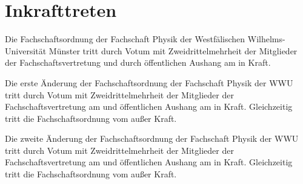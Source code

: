 \section{Inkrafttreten}
Die Fachschaftsordnung der Fachschaft Physik der Westfälischen Wilhelms-Universität Münster tritt durch Votum mit Zweidrittelmehrheit der Mitglieder der Fachschaftsvertretung und durch öffentlichen Aushang am  in Kraft.

Die erste Änderung der Fachschaftsordnung der Fachschaft Physik der WWU tritt durch Votum mit Zweidrittelmehrheit der Mitglieder der Fachschaftsvertretung am  und öffentlichen Aushang am  in Kraft.
Gleichzeitig tritt die Fachschaftsordnung vom  außer Kraft.

Die zweite Änderung der Fachschaftsordnung der Fachschaft Physik der WWU tritt durch Votum mit Zweidrittelmehrheit der Mitglieder der Fachschaftsvertretung am  und öffentlichen Aushang am  in Kraft.
Gleichzeitig tritt die Fachschaftsordnung vom  außer Kraft.


